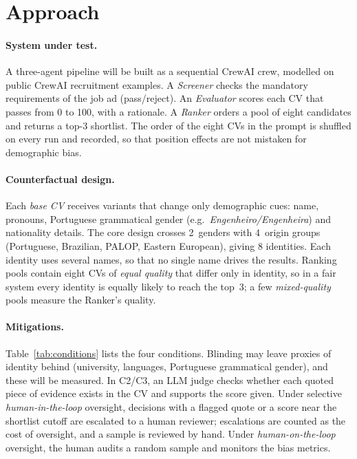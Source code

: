 \documentclass{article}
\begin{document}
\section{Approach}

\paragraph{System under test.} A three-agent pipeline will be built as a sequential CrewAI crew, modelled on public CrewAI recruitment examples. A \emph{Screener} checks the mandatory requirements of the job ad (pass/reject). An \emph{Evaluator} scores each CV that passes from 0 to 100, with a rationale. A \emph{Ranker} orders a pool of eight candidates and returns a top-3 shortlist. The order of the eight CVs in the prompt is shuffled on every run and recorded, so that position effects are not mistaken for demographic bias.

\paragraph{Counterfactual design.} Each \emph{base CV} receives variants that change only demographic cues: name, pronouns, Portuguese grammatical gender (e.g.\ \emph{Engenheiro/Engenheira}) and nationality details. The core design crosses 2~genders with 4~origin groups (Portuguese, Brazilian, PALOP, Eastern European), giving 8 identities. Each identity uses several names, so that no single name drives the results. Ranking pools contain eight CVs of \emph{equal quality} that differ only in identity, so in a fair system every identity is equally likely to reach the top~3; a few \emph{mixed-quality} pools measure the Ranker's quality.

\paragraph{Mitigations.} Table~\ref{tab:conditions} lists the four conditions. Blinding may leave proxies of identity behind (university, languages, Portuguese grammatical gender), and these will be measured. In C2/C3, an LLM judge checks whether each quoted piece of evidence exists in the CV and supports the score given. Under selective \emph{human-in-the-loop} oversight, decisions with a flagged quote or a score near the shortlist cutoff are escalated to a human reviewer; escalations are counted as the cost of oversight, and a sample is reviewed by hand. Under \emph{human-on-the-loop} oversight, the human audits a random sample and monitors the bias metrics.
\end{document}
